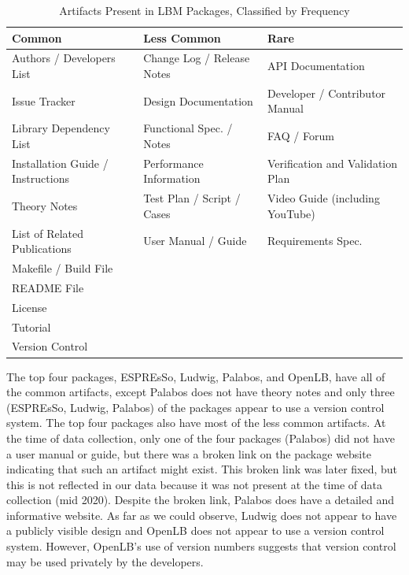 \documentclass[final, 3p, times, authoryear]{elsarticle}
\begin{document}
\begin{table}
\begin{center}
\begin{tabular}{ p{5.3 cm} p{4.9 cm} p{5 cm}}
\toprule
\textbf{Common} & \textbf{Less Common} & \textbf{Rare} \\
\midrule
Authors / Developers List & Change Log / Release Notes & API Documentation\\
Issue Tracker & Design Documentation & Developer / Contributor Manual\\
Library Dependency List & Functional Spec. / Notes & FAQ / Forum\\
Installation Guide / Instructions & Performance Information & Verification and
Validation Plan\\
Theory Notes & Test Plan / Script / Cases & Video Guide
(including YouTube)\\
List of Related Publications & User Manual / Guide & Requirements Spec.\\
Makefile / Build File &  & \\
README File & & \\
License & & \\
Tutorial & & \\
Version Control & & \\
\bottomrule
\end{tabular}
\caption{Artifacts Present in LBM Packages, Classified by Frequency}
\label{artifactspresent}
\end{center}
\end{table}

The top four packages, ESPREsSo, Ludwig, Palabos, and OpenLB, have all of the
common artifacts, except Palabos does not have theory notes and only three (ESPREsSo, Ludwig, Palabos) of the packages appear to use a version control system.  The top four packages also have most of the less common artifacts. At the time of data collection, only one of the four packages (Palabos) did not have a user manual or guide, but there was a broken link on the package website indicating that such an artifact might exist. This broken link was later fixed, but this is not reflected in our data because it was not present at the time of data collection (mid 2020). Despite the broken link, Palabos does have a detailed and informative website. As far as we could observe, Ludwig does not appear to have a publicly visible design and OpenLB does not appear to use a version control system. However, OpenLB's use of version numbers suggests that version control may be used privately by the developers.
\end{document}
